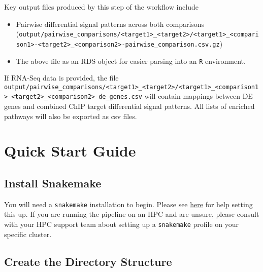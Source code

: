 \documentclass[
]{book}
\providecommand{\tightlist}{%
  \setlength{\itemsep}{0pt}\setlength{\parskip}{0pt}}
\begin{document}
Key output files produced by this step of the workflow include

\begin{itemize}
\tightlist
\item
  Pairwise differential signal patterns across both comparisons (\texttt{output/pairwise\_comparisons/\textless{}target1\textgreater{}\_\textless{}target2\textgreater{}/\textless{}target1\textgreater{}\_\textless{}comparison1\textgreater{}-\textless{}target2\textgreater{}\_\textless{}comparison2\textgreater{}-pairwise\_comparison.csv.gz})
\item
  The above file as an RDS object for easier parsing into an \texttt{R} environment.
\end{itemize}

If RNA-Seq data is provided, the file \texttt{output/pairwise\_comparisons/\textless{}target1\textgreater{}\_\textless{}target2\textgreater{}/\textless{}target1\textgreater{}\_\textless{}comparison1\textgreater{}-\textless{}target2\textgreater{}\_\textless{}comparison2\textgreater{}-de\_genes.csv} will contain mappings between DE genes and combined ChIP target differential signal patterns.
All lists of enriched pathways will also be exported as csv files.

\hypertarget{quick-start}{%
\chapter{Quick Start Guide}\label{quick-start}}

\hypertarget{snakemake}{%
\section{Install Snakemake}\label{snakemake}}

You will need a \texttt{snakemake} installation to begin.
Please see \href{https://snakemake.readthedocs.io/en/stable/getting_started/installation.html}{here} for help setting this up.
If you are running the pipeline on an HPC and are unsure, please consult with your HPC support team about setting up a \texttt{snakemake} profile on your specific cluster.

\hypertarget{quick-directories}{%
\section{Create the Directory Structure}\label{quick-directories}}
\end{document}
